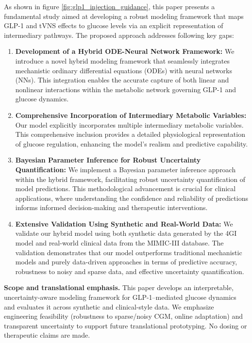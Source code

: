 \documentclass[9pt,shortpaper,twoside,web]{ieeecolor}
\begin{document}
As shown in figure \ref{fig:glp1_injection_guidance}, this paper presents a fundamental study aimed at developing a robust modeling framework that maps GLP-1 and tVNS effects to glucose levels via an explicit representation of intermediary pathways. The proposed approach addresses following key gaps:

\begin{enumerate}
    \item \textbf{Development of a Hybrid ODE-Neural Network Framework:} We introduce a novel hybrid modeling framework that seamlessly integrates mechanistic ordinary differential equations (ODEs) with neural networks (NNs). This integration enables the accurate capture of both linear and nonlinear interactions within the metabolic network governing GLP-1 and glucose dynamics.
    \item \textbf{Comprehensive Incorporation of Intermediary Metabolic Variables:} Our model explicitly incorporates multiple intermediary metabolic variables. This comprehensive inclusion provides a detailed physiological representation of glucose regulation, enhancing the model's realism and predictive capability.
    \item \textbf{Bayesian Parameter Inference for Robust Uncertainty Quantification:} We implement a Bayesian parameter inference approach within the hybrid framework, facilitating robust uncertainty quantification of model predictions. This methodological advancement is crucial for clinical applications, where understanding the confidence and reliability of predictions informs informed decision-making and therapeutic interventions.
    \item \textbf{Extensive Validation Using Synthetic and Real-World Data:} We validate our hybrid model using both synthetic data generated by the 4GI model and real-world clinical data from the MIMIC-III database. The validation demonstrates that our model outperforms traditional mechanistic models and purely data-driven approaches in terms of predictive accuracy, robustness to noisy and sparse data, and effective uncertainty quantification.
\end{enumerate}

\noindent\textbf{Scope and translational emphasis.}
This paper develops an interpretable, uncertainty-aware modeling framework for GLP-1–mediated glucose dynamics and evaluates it across synthetic and clinical-style data. We emphasize engineering feasibility (robustness to sparse/noisy CGM, online adaptation) and transparent uncertainty to support future translational prototyping. No dosing or therapeutic claims are made.
\end{document}
